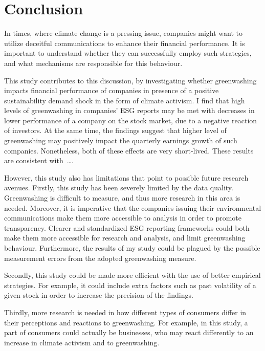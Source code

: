 \documentclass[12pt]{article}
\begin{document}
\newpage


\section{Conclusion}\label{sect:discussion}

In times, where climate change is a pressing issue, companies might want to utilize deceitful communications to enhance their financial performance. It is important to understand whether they can successfully employ such strategies, and what mechanisms are responsible for this behaviour. 

This study contributes to this discussion, by investigating whether greenwashing impacts financial performance of companies in presence of a positive sustainability demand shock in the form of climate activism. I find that high levels of greenwashing in companies' ESG reports may be met with decreases in lower performance of a company on the stock market, due to a negative reaction of investors. At the same time, the findings suggest that higher level of greenwashing may positively impact the quarterly earnings growth of such companies. Nonetheless, both of these effects are very short-lived. These results are consistent with\ \dots. 

However, this study also has limitations that point to possible future research avenues. Firstly, this study has been severely limited by the data quality. Greenwashing is difficult to measure, and thus more research in this area is needed. Moreover, it is imperative that the companies issuing their environmental communications make them more accessible to analysis in order to promote transparency. Clearer and standardized ESG reporting frameworks could both make them more accessible for research and analysis, and limit greenwashing behaviour. Furthermore, the results of my study could be plagued by the possible measurement errors from the adopted greenwashing measure. 

Secondly, this study could be made more efficient with the use of better empirical strategies. For example, it could include extra factors such as past volatility of a given stock in order to increase the precision of the findings. 

Thirdly, more research is needed in how different types of consumers differ in their perceptions and reactions to greenwashing. For example, in this study, a part of consumers could actually be businesses, who may react differently to an increase in climate activism and to greenwashing. 
\end{document}
